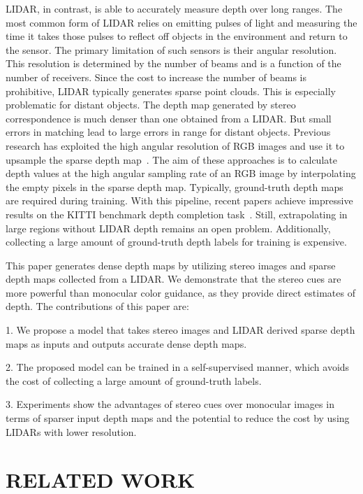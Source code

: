 \documentclass[letterpaper, 10 pt, conference]{ieeeconf}
\begin{document}
    LIDAR, in contrast, is able to accurately measure depth over long ranges. The most common form of LIDAR relies on emitting pulses of light and measuring the time it takes those pulses to reflect off objects in the environment and return to the sensor. The primary limitation of such sensors is their angular resolution. This resolution is determined by the number of beams and is a function of the number of receivers. Since the cost to increase the number of beams is prohibitive, LIDAR typically generates sparse point clouds. This is especially problematic for distant objects. The depth map generated by stereo correspondence is much denser than one obtained from a LIDAR. But small errors in matching lead to large errors in range for distant objects.
Previous research has exploited the high angular resolution of RGB images and use it to upsample the sparse depth map~\cite{ferstl2013image, maSelf,van2019sparse,spatialProp}. The aim of these approaches is to calculate depth values at the high angular sampling rate of an RGB image by interpolating the empty pixels in the sparse depth map. Typically, ground-truth depth maps are required during training. With this pipeline, recent papers achieve impressive results on the KITTI benchmark depth completion task~\cite{sparsityCNN}. Still, extrapolating in large regions without LIDAR depth remains an open problem. Additionally, collecting a large amount of ground-truth depth labels for training is expensive.
    
  This paper generates dense depth maps by utilizing stereo images and sparse depth maps collected from a LIDAR. We demonstrate that the stereo cues are more powerful than monocular color guidance, as they provide direct estimates of depth. The contributions of this paper are:
    
    1. We propose a model that takes stereo images and LIDAR derived sparse depth maps as inputs and outputs accurate dense depth maps.

    2. The proposed model can be trained in a self-supervised manner, which avoids the cost of collecting a large amount of ground-truth labels. 

    3. Experiments show the advantages of stereo cues over monocular images in terms of sparser input depth maps and the potential to reduce the cost by using LIDARs with lower resolution.


\section{RELATED WORK}
\end{document}
